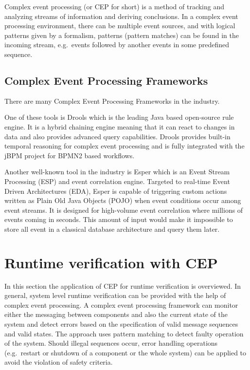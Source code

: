 Complex event processing (or CEP for short) is a method of tracking and analyzing streams of information and deriving conclusions. In a complex event processing environment, there can be multiple event sources, and with logical patterns given by a formalism, patterns (pattern matches) can be found in the incoming stream, e.g.~events followed by another events in some predefined sequence.

\subsection{Complex Event Processing Frameworks}
There are many Complex Event Processing Frameworks in the industry.

One of these tools is Drools\citep{drools} which is the leading Java based open-source rule engine. It is a hybrid chaining engine meaning that it can react to changes in data and also provides advanced query capabilities. Drools provides built-in temporal reasoning for complex event processing and is fully integrated with the jBPM project for BPMN2 based workflows.

Another well-known tool in the industry is Esper\citep{esper} which is an Event Stream Processing (ESP) and event correlation engine.
Targeted to real-time Event Driven Architectures (EDA), Esper is capable of triggering custom actions written as Plain Old Java Objects (POJO) when event conditions occur among event streams. It is designed for high-volume event correlation where millions of events coming in seconds. This amount of input would make it impossible to store all event in a classical database architecture and query them later.

\section{Runtime verification with CEP}
In this section the application of CEP for runtime verification is overviewed.
In general, system level runtime verification can be provided with the help of complex event processing. A complex event processing framework can monitor either the messaging between components and also the current state of the system and detect errors based on the specification of valid message sequences and valid states. 
The approach uses pattern matching to detect faulty operation of the system. Should illegal sequences occur, error handling operations (e.g.~restart or shutdown of a component or the whole system) can be applied to avoid the violation of safety criteria.



